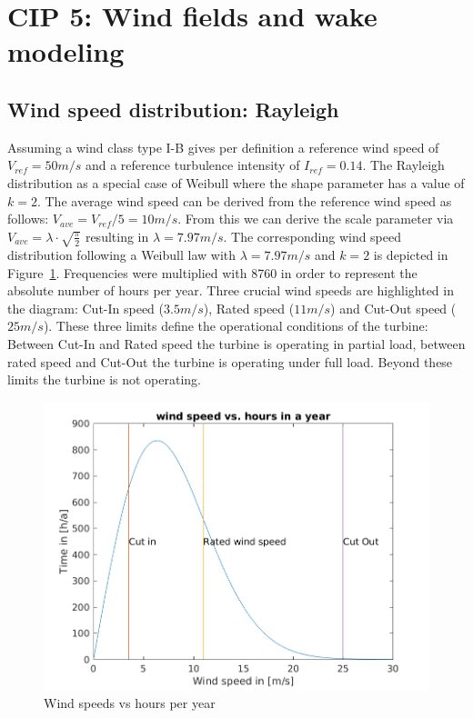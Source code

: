 \documentclass[10pt]{article}
\begin{document}
\section{CIP 5: Wind fields and wake modeling}
\subsection{Wind speed distribution: Rayleigh}
Assuming a wind class type I-B gives per definition a reference wind speed of $V_{ref} = 50 m/s$ and a reference turbulence intensity of $I_{ref}=0.14$. The Rayleigh distribution as a special case of Weibull where the shape parameter has a value of $k=2$. The average wind speed can be derived from the reference wind speed as follows: $V_{ave}=V_{ref}/5 =10 m/s$. From this we can derive the scale parameter via $V_{ave} =  \lambda \cdot \sqrt{\frac{\pi}{2}}$ resulting in $\lambda = 7.97 m/s$. The corresponding wind speed distribution following a Weibull law with $\lambda = 7.97 m/s$ and $k=2$ is depicted in Figure~\ref{fig:rayleigh}. Frequencies were multiplied with 8760 in order to represent the absolute number of hours per year. Three crucial wind speeds are highlighted in the diagram: Cut-In speed ($3.5 m/s$), Rated speed ($11 m/s$) and Cut-Out speed ($25 m/s$). These three limits define the operational conditions of the turbine: Between Cut-In and Rated speed the turbine is operating in partial load, between rated speed and Cut-Out the turbine is operating under full load. Beyond these limits the turbine is not operating.

\begin{figure}[H]
\centering
\includegraphics[width=1\linewidth]{../CIP_5/CIP_Tutorial_5_-_Windfield_and_wake_simulation/windspeed_vs_hours_year.png}
\caption{Wind speeds vs hours per year}
\label{fig:rayleigh}
\end{figure} 
\end{document}
